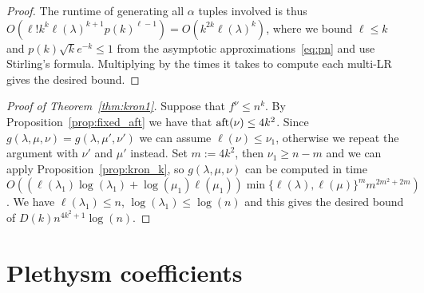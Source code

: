 \documentclass[11pt]{amsart}
\theoremstyle{plain}
\theoremstyle{definition}
\numberwithin{equation}{section}
\newcommand{\la}{\lambda}
\newcommand{\al}{\alpha}
\def\la{\lambda}
\begin{document}
\begin{proof}
The runtime of generating all $\al$ tuples involved  is thus $O(   \ell! k^k\ell(\la)^{k+1}p(k)^{\ell-1})=O(k^{2k}\ell(\la)^k)$, where we bound $\ell \leq k$ and $p(k) \sqrt{k}e^{-k} \leq 1$ from the asymptotic approximations~\eqref{eq:pn} and use Stirling's formula. Multiplying by the times it takes to compute each multi-LR gives the desired bound. 
\end{proof}

\begin{proof}[Proof of Theorem~\ref{thm:kron1}]
Suppose that $f^\nu \leq n^k$. By Proposition~\ref{prop:fixed_aft} we have that ${\rm aft}(\nu)\leq 4k^2$. Since $g(\la,\mu,\nu)=g(\la,\mu',\nu')$ we can assume $\ell(\nu)\leq \nu_1$, otherwise we repeat the argument with $\nu'$ and $\mu'$ instead. Set $m:=4k^2$, then $\nu_1 \geq n-m$ and we can apply Proposition~\ref{prop:kron_k}, so $g(\la,\mu,\nu)$ can be computed in time $ O(( \ell(\la_1)\log(\la_1)+\log(\mu_1)\ell(\mu_1)) \min\{\ell(\la),\ell(\mu)\}^m  m^{2m^2+2m})$. We have $\ell(\la_1) \leq n$, $\log(\la_1) \leq \log(n)$ and this gives the desired bound of $D(k) n^{4k^2+1}\log(n)$.
\end{proof}

\section{Plethysm coefficients}\label{sec:pleth}
\end{document}
